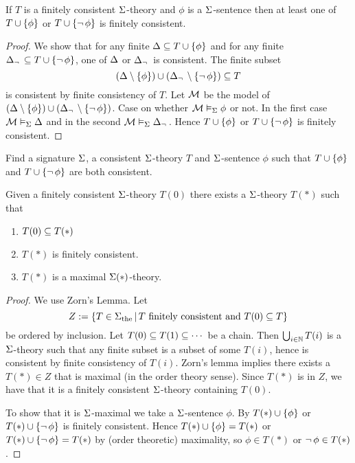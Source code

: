 \begin{lem}
    If $T$ is a finitely consistent $\Sigma$-theory 
    and $\phi$ is a $\Sigma$-sentence then at least one of
    $T \cup \left\{\phi\right\}$ or $T \cup \left\{\neg\, \phi\right\}$ is finitely consistent.
\end{lem}
\begin{proof}
    We show that for any finite $\Delta \subseteq T \cup \left\{\phi\right\}$ and 
    for any finite $\Delta_\neg\, \subseteq T \cup \left\{\neg\, \phi\right\}$,
    one of $\Delta$ or $\Delta_\neg\,$ is consistent. 
    The finite subset
    \[(\Delta \setminus \left\{\phi\right\}) \cup 
    (\Delta_\neg\, \setminus \left\{\neg\, \phi\right\}) \subseteq T\]
    is consistent by finite consistency of $T$.
    Let $\mathcal{M}$ be the model of 
    $(\Delta \setminus \left\{\phi\right\}) \cup 
    (\Delta_\neg\, \setminus \left\{\neg\, \phi\right\})$.
    Case on whether $\mathcal{M} \vDash_{\Sigma} \phi$ or not.
    In the first case $\mathcal{M} \vDash_{\Sigma} \Delta$
    and in the second $\mathcal{M} \vDash_{\Sigma} \Delta_\neg\,$.
    Hence $T \cup \left\{\phi\right\}$ or $T \cup \left\{\neg\, \phi\right\}$ 
    is finitely consistent.
\end{proof}

\begin{ex}
    Find a signature $\Sigma$, a consistent $\Sigma$-theory $T$
    and $\Sigma$-sentence $\phi$ such that  
    $T \cup \left\{\phi\right\}$ and 
    $T \cup \left\{\neg\, \phi\right\}$ are both consistent.
\end{ex}
    
\begin{prop}
    Given a finitely consistent $\Sigma$-theory $T(0)$
    there exists a $\Sigma$-theory $T(*)$ such that 
    \begin{enumerate}
        \item $T(0) \subseteq T(*)$
        \item $T(*)$ is finitely consistent.
        \item $T(*)$ is a maximal $\Sigma(*)$-theory.
    \end{enumerate}
\end{prop}
\begin{proof}
    We use Zorn's Lemma.
    Let 
    \[Z := \left\{T \in {\Sigma}_\mathrm{the} \,|\, T 
    \text{ finitely consistent and } T(0) \subseteq T\right\}\]
    be ordered by inclusion.
    Let $T(0) \subseteq T(1) \subseteq \cdots $ be a chain.
    Then $\bigcup_{i \in \mathbb{N}} T(i)$ is a $\Sigma$-theory
    such that any finite subset is a subset of some $T(i)$,
    hence is consistent by finite consistency of $T(i)$.
    Zorn's lemma implies there exists a $T(*) \in Z$
    that is maximal (in the order theory sense).
    Since $T(*)$ is in $Z$, 
    we have that it is a finitely consistent $\Sigma$-theory containing $T(0)$.
    
    To show that it is $\Sigma$-maximal we take a $\Sigma$-sentence $\phi$.
    By  
    $T(*) \cup \left\{\phi\right\}$ or 
    $T(*) \cup \left\{\neg\, \phi\right\}$ is finitely consistent.
    Hence 
    $T(*) \cup \left\{\phi\right\} = T(*)$ or 
    $T(*) \cup \left\{\neg\, \phi\right\} = T(*)$ by (order theoretic) maximality,
    so $\phi \in T(*)$ or $\neg\, \phi \in T(*)$.
\end{proof}

